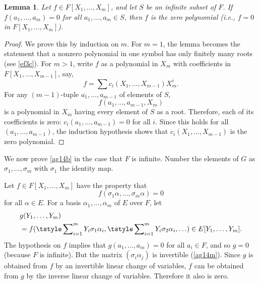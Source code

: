 \documentclass[a4paper,11pt,final,openany]{memoir}
\newtheorem{lemma}[X]{Lemma}
\theoremstyle{nonumberplain}
\newtheorem{proof}{Proof.}
\begin{document}
\begin{lemma}
\label{ag14c}Let $f\in F[X_{1},\ldots,X_{m}]$, and let $S$ be an infinite
subset of $F$. If $f(a_{1},\ldots,a_{m})=0$ for all $a_{1},\ldots,a_{m}\in S$,
then $f$ is the zero polynomial (i.e., $f=0$ in $F[X_{1},\ldots,X_{m}]$).
\end{lemma}

\begin{proof}
We prove this by induction on $m$. For $m=1$, the lemma becomes the statement
that a nonzero polynomial in one symbol has only finitely many roots (see
\ref{ef3c}). For $m>1$, write $f$ as a polynomial in $X_{m}$ with coefficients
in $F[X_{1},\ldots,X_{m-1}]$, say,
\[
f=\sum c_{i}(X_{1},\ldots,X_{m-1})X_{m}^{i}.
\]
For any $(m-1)$-tuple $a_{1},\ldots,a_{m-1}$ of elements of $S$,%
\[
f(a_{1},\ldots,a_{m-1},X_{m})
\]
is a polynomial in $X_{m}$ having every element of $S$ as a root. Therefore,
each of its coefficients is zero: $c_{i}(a_{1},\ldots,a_{m-1})=0$ for all $i$.
Since this holds for all $(a_{1},\ldots,a_{m-1})$, the induction hypothesis
shows that $c_{i}(X_{1},\ldots,X_{m-1})$ is the zero polynomial.
\end{proof}

We now prove \ref{ag14b} in the case that $F$ is infinite. Number the elements
of $G$ as $\sigma_{1},\ldots,\sigma_{m}$ with $\sigma_{1}$ the identity map.

Let $f\in F[X_{1},\ldots,X_{m}]$ have the property that
\[
f(\sigma_{1}\alpha,\ldots,\sigma_{m}\alpha)=0
\]
for all $\alpha\in E$. For a basis $\alpha_{1},\ldots,\alpha_{m}$ of $E$ over
$F$, let
\begin{align*}
&g(Y_{1},\ldots,Y_{m})\\
&=f(\tstyle\sum\nolimits_{i=1}^{m}Y_{i}\sigma_{1}%
\alpha_{i}, \tstyle\sum\nolimits_{i=1}^{m}Y_{i}\sigma_{2}\alpha_{i},\ldots)\in
E[Y_{1},\ldots,Y_{m}]\text{.}%
\end{align*}
The hypothesis on $f$ implies that $g(a_{1},\ldots,a_{m})=0$ for all $a_{i}\in
F$, and so $g=0$ (because $F$ is infinite). But the matrix $(\sigma_{i}%
\alpha_{j})$ is invertible (\ref{ag14m}). Since $g$ is obtained from $f$ by an
invertible linear change of variables, $f$ can be obtained from $g$ by the
inverse linear change of variables. Therefore it also is zero.
\end{document}
